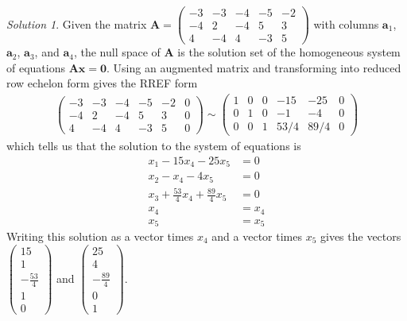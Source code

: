 \documentclass[
]{book}
\theoremstyle{definition}
\theoremstyle{definition}
\theoremstyle{definition}
\theoremstyle{remark}
\newtheorem*{solution}{Solution}
\begin{document}
\begin{solution}

Given the matrix \(\mathbf{A} = \begin{pmatrix} -3 & -3 & -4 & -5 & -2 \\ -4 & 2 & -4 & 5 & 3 \\ 4 & -4 & 4 & -3 & 5 \end{pmatrix}\) with columns \(\mathbf{a}_1\), \(\mathbf{a}_2\), \(\mathbf{a}_3\), and \(\mathbf{a}_4\), the null space of \(\mathbf{A}\) is the solution set of the homogeneous system of equations \(\mathbf{A} \mathbf{x} = \mathbf{0}\). Using an augmented matrix and transforming into reduced row echelon form gives the RREF form
\[
\begin{aligned}
\begin{pmatrix} -3 & -3 & -4 & -5 & -2 & 0 \\ -4 & 2 & -4 & 5 & 3 & 0 \\ 4 & -4 & 4 & -3 & 5 & 0 \end{pmatrix} \sim \begin{pmatrix} 1 & 0 & 0 & -15 & -25 & 0 \\ 0 & 1 & 0 & -1 & -4 & 0 \\ 0 & 0 & 1 & 53/4 & 89/4 & 0 \end{pmatrix}
\end{aligned}
\]
which tells us that the solution to the system of equations is
\[
\begin{aligned}
x_1 - 15 x_4 -25 x_5 & = 0 \\
x_2 - x_4 - 4 x_5 & = 0 \\
x_3 + \frac{53}{4} x_4  + \frac{89}{4} x_5 & = 0\\
x_4 & = x_4 \\
x_5 & = x_5
\end{aligned}
\]
Writing this solution as a vector times \(x_4\) and a vector times \(x_5\) gives the vectors \(\begin{pmatrix} 15 \\ 1 \\ -\frac{53}{4} \\ 1 \\ 0 \end{pmatrix}\) and \(\begin{pmatrix} 25 \\ 4 \\ -\frac{89}{4} \\ 0 \\ 1 \end{pmatrix}\).


\end{solution}
\end{document}

